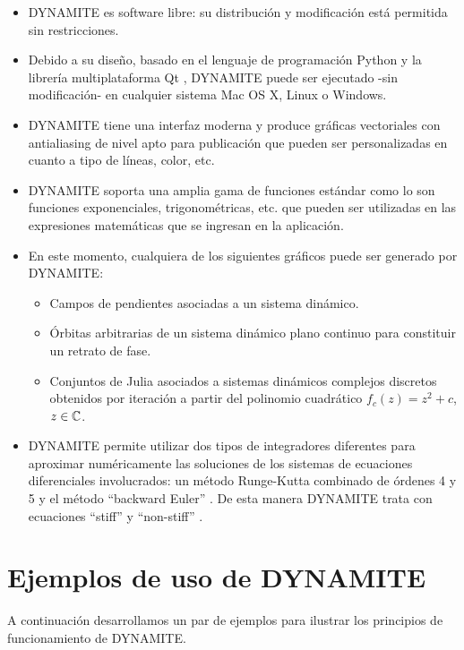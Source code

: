 \begin{itemize}
	\item DYNAMITE es software libre: su distribución y modificación está permitida sin restricciones.
	\item Debido a su diseño, basado en el lenguaje de programación Python \cite{python} y la librería multiplataforma Qt \cite{libqt}, DYNAMITE puede ser ejecutado -sin modificación- en cualquier sistema Mac OS X, Linux o Windows.
	\item DYNAMITE tiene una interfaz moderna y produce gráficas vectoriales con antialiasing \cite{pcmagantialiasing} de nivel apto para publicación que pueden ser personalizadas en cuanto a tipo de líneas, color, etc.
	\item DYNAMITE soporta una amplia gama de funciones estándar como lo son funciones exponenciales, trigonométricas, etc. que pueden ser utilizadas en las expresiones matemáticas que se ingresan en la aplicación.
	\item En este momento, cualquiera de los siguientes gráficos puede ser generado por DYNAMITE:
		\begin{itemize}
			\item Campos de pendientes asociadas a un sistema dinámico.
			\item Órbitas arbitrarias de un sistema dinámico plano continuo para constituir un retrato de fase.
			\item Conjuntos de Julia \cites{complexdynamics,milnorcomplex} asociados a sistemas dinámicos complejos discretos obtenidos por iteración a partir del polinomio cuadrático $f_c(z) = z^2 + c$, $z \in {\ensuremath{\mathbb{C}}}$.
		\end{itemize}
	\item DYNAMITE permite utilizar dos tipos de integradores diferentes para aproximar numéricamente las soluciones de los sistemas de ecuaciones diferenciales involucrados: un método Runge-Kutta combinado de órdenes 4 y 5 \cites[p.~518]{analisisnumerico}{fehlberg} y el método ``backward Euler'' \cites[p.~584]{analisisnumerico}{butcher}. De esta manera DYNAMITE  trata con ecuaciones ``stiff'' \cites{stiff}[p.~583]{analisisnumerico} y ``non-stiff'' \cite{nonstiff}.
\end{itemize}

\section{Ejemplos de uso de DYNAMITE}

A continuación desarrollamos un par de ejemplos para ilustrar los principios de funcionamiento de DYNAMITE.

